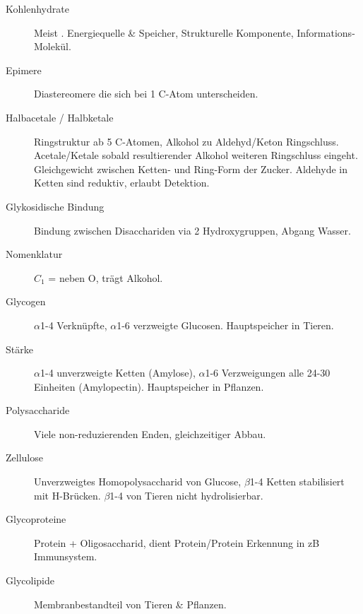 \documentclass[a4paper,twocolumn,english,fontsize=7,DIV=16]{scrartcl}
\begin{document}
\begin{description}
	\item[Kohlenhydrate] Meist . Energiequelle \& Speicher,
		Strukturelle Komponente, Informations-Molekül.
	\item[Epimere] Diastereomere die sich bei 1 C-Atom unterscheiden.
	\item[Halbacetale / Halbketale] Ringstruktur ab 5 C-Atomen, Alkohol zu
		Aldehyd/Keton Ringschluss. Acetale/Ketale sobald resultierender
		Alkohol weiteren Ringschluss eingeht. Gleichgewicht zwischen
		Ketten- und Ring-Form der Zucker. Aldehyde in Ketten sind
		reduktiv, erlaubt Detektion.
	\item[Glykosidische Bindung] Bindung zwischen Disacchariden via 2
		Hydroxygruppen, Abgang Wasser.
	\item[Nomenklatur] $C_1$ = neben O, trägt Alkohol.
	\item[Glycogen] $\alpha$1-4 Verknüpfte, $\alpha$1-6 verzweigte
		Glucosen. Hauptspeicher in Tieren.
	\item[Stärke] $\alpha$1-4 unverzweigte Ketten (Amylose), $\alpha$1-6
		Verzweigungen alle 24-30 Einheiten (Amylopectin). Hauptspeicher
		in Pflanzen.
	\item[Polysaccharide] Viele non-reduzierenden Enden, gleichzeitiger Abbau.
	\item[Zellulose] Unverzweigtes Homopolysaccharid von Glucose,
		$\beta$1-4 Ketten stabilisiert mit H-Brücken. $\beta$1-4 von
		Tieren nicht hydrolisierbar.
	\item[Glycoproteine] Protein + Oligosaccharid, dient Protein/Protein
		Erkennung in zB Immunsystem.
	\item[Glycolipide] Membranbestandteil von Tieren \& Pflanzen.
\end{description}
\end{document}

